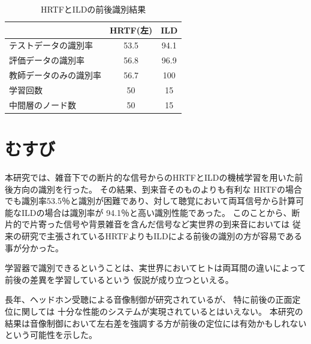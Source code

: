 \documentclass[autodetect-engine,dvi=dvipdfmx,ja=standard,twocolumn,jbase=13.35Q]{bxjsarticle}
\begin{document}
\begin{table}[htbp]
     \centering
     \begin{tabular}{l|c|c}
          & HRTF(左) & ILD \\\hline
          テストデータの識別率 & 53.5 & 94.1 \\
          評価データの識別率 & 56.8 & 96.9  \\ 
          教師データのみの識別率 & 56.7 &  100  \\
          学習回数 & 50 & 15  \\
          中間層のノード数 & 50 & 15  \\ 
     \end{tabular}
     \caption{HRTFとILDの前後識別結果}
     \label{tb:fugafuga2}
\end{table}

\section{むすび}

本研究では、雑音下での断片的な信号からのHRTFとILDの機械学習を用いた前後方向の識別を行った。
その結果、到来音そのものよりも有利な
HRTFの場合でも識別率53.5％と識別が困難であり、対して聴覚において両耳信号から計算可能なILDの場合は識別率が 94.1％と高い識別性能であった。
このことから、断片的で片寄った信号や背景雑音を含んだ信号など実世界の到来音においては
従来の研究で主張されているHRTFよりもILDによる前後の識別の方が容易である事が分かった。

学習器で識別できるということは、実世界においてヒトは両耳間の違いによって前後の差異を学習しているという
仮説が成り立つといえる。

長年、ヘッドホン受聴による音像制御が研究されているが、
特に前後の正面定位に関しては
十分な性能のシステムが実現されているとはいえない。
本研究の結果は音像制御において左右差を強調する方が前後の定位には有効かもしれないという可能性を示した。
\end{document}
